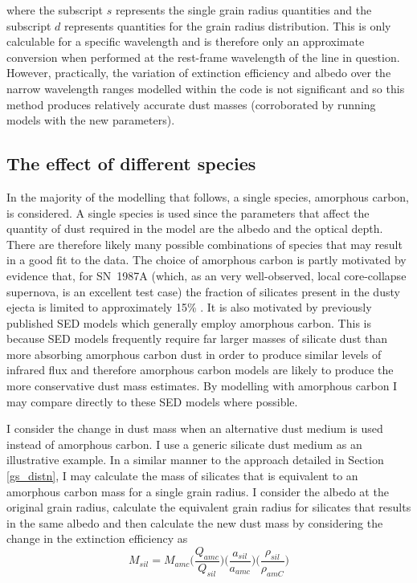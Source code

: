 where the subscript $s$ represents the single grain radius quantities and the subscript  $d$ represents quantities for the grain radius distribution.  This is only calculable for a specific wavelength and is therefore only an approximate conversion when performed at the rest-frame wavelength of the line in question.  However, practically, the variation of extinction efficiency and albedo over the narrow wavelength ranges modelled within the code is not significant and so this method produces relatively accurate dust masses (corroborated by running models with the new parameters).

\subsection{The effect of different species}
In the majority of the modelling that follows, a single species, amorphous carbon, is considered.   A single species is used since the parameters that affect the quantity of dust required in the model are the albedo and the optical depth.  There are therefore  likely many possible combinations of species that may result in a good fit to the data.  The choice of amorphous carbon is partly motivated by evidence that, for SN~1987A (which, as an very well-observed, local core-collapse supernova, is an excellent test case) the fraction of silicates present in the dusty ejecta is limited to approximately 15\% \citep{Ercolano2007,Wesson2015}.  It is also motivated by previously published SED models which generally employ amorphous carbon.  This is because SED models frequently require far larger masses of silicate dust than more absorbing amorphous carbon dust in order to produce similar levels of infrared flux and therefore amorphous carbon models are likely to produce the more conservative dust mass estimates.  By modelling with amorphous carbon I may compare directly to these SED models where possible.

I consider the change in dust mass when an alternative dust medium is used instead of amorphous carbon.  I use a generic silicate dust medium as an illustrative example.
 In a similar manner to the approach detailed in Section \ref{gs_distn}, I may calculate the mass of silicates that is equivalent to an amorphous carbon mass for a single grain radius.  I consider the albedo at the original grain radius, calculate the equivalent grain radius for silicates that results in the same albedo and then calculate the new dust mass by considering the change in the extinction efficiency as
\begin{equation}
\label{species_conversion}
M_{sil} = M_{amc} \Big( \frac{Q_{amc}}{Q_{sil}} \Big) \Big(\frac{a_{sil}}{a_{amc}}\Big) \Big(\frac{\rho_{sil}}{\rho_{amC}}\Big)
\end{equation}

